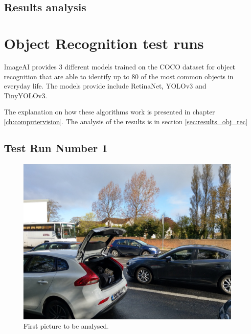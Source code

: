    \newpage
    \subsection{Results analysis}
    \label{sec:results_image_rec}
    



\newpage
\section{Object Recognition test runs}
\label{sec:object_test}

\par ImageAI provides 3 different models trained on the COCO dataset for object recognition that are able to identify up to 80 of the most common objects in everyday life. The models provide include RetinaNet, YOLOv3 and TinyYOLOv3. \cite{ImageAI}
\par The explanation on how these algorithms work is presented in chapter \ref{ch:computervision}. The analysis of the results is in section  \ref{sec:results_obj_rec}

    \subsection{Test Run Number 1}

    \begin{figure}[htb]
        \centering
        \includegraphics[scale = 0.20]{Sections/4InitialWork/4_images_obj_run1/photo.jpg}
        \caption{First picture to be analysed.} 
    \end{figure}

